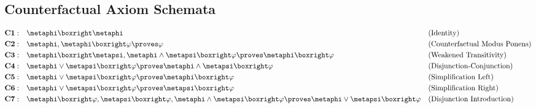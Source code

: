 \documentclass[../LogosReference.tex]{subfiles}
\begin{document}

\subsection{Counterfactual Axiom Schemata}\label{sec:counterfactual-axiom-schemata}

\begin{definition}\label{def:counterfactual-axioms}
	\begin{align}
		\textbf{C1}: \quad & \metaphi \boxright \metaphi                                                                                                                    &  & \text{(Identity)}                    \\
		\textbf{C2}: \quad & \metaphi, \metaphi \boxright \metaA \proves \metaA                                                                                             &  & \text{(Counterfactual Modus Ponens)} \\
		\textbf{C3}: \quad & \metaphi \boxright \metapsi, \metaphi \land \metapsi \boxright \metaA \proves \metaphi \boxright \metaA                                        &  & \text{(Weakened Transitivity)}       \\
		\textbf{C4}: \quad & \metaphi \lor \metapsi \boxright \metaA \proves \metaphi \land \metapsi \boxright \metaA                                                       &  & \text{(Disjunction-Conjunction)}     \\
		\textbf{C5}: \quad & \metaphi \lor \metapsi \boxright \metaA \proves \metaphi \boxright \metaA                                                                      &  & \text{(Simplification Left)}         \\
		\textbf{C6}: \quad & \metaphi \lor \metapsi \boxright \metaA \proves \metapsi \boxright \metaA                                                                      &  & \text{(Simplification Right)}        \\
		\textbf{C7}: \quad & \metaphi \boxright \metaA, \metapsi \boxright \metaA, \metaphi \land \metapsi \boxright \metaA \proves \metaphi \lor \metapsi \boxright \metaA &  & \text{(Disjunction Introduction)}
	\end{align}
\end{definition}
\end{document}
